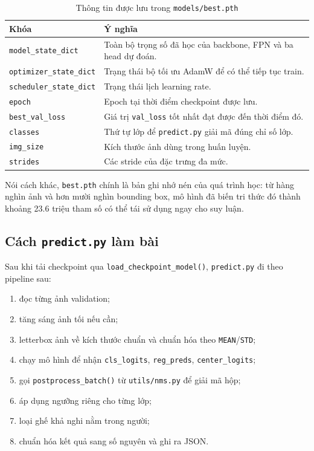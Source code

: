 \documentclass[12pt,a4paper]{article}
\begin{document}
\begin{table}[H]
\centering
\caption{Thông tin được lưu trong \texttt{models/best.pth}}
\label{tab:checkpoint}
\begin{tabularx}{\textwidth}{>{\raggedright\arraybackslash}p{3.3cm}Y}
\toprule
Khóa & Ý nghĩa \\
\midrule
\texttt{model\_state\_dict} & Toàn bộ trọng số đã học của backbone, FPN và ba head dự đoán. \\
\texttt{optimizer\_state\_dict} & Trạng thái bộ tối ưu AdamW để có thể tiếp tục train. \\
\texttt{scheduler\_state\_dict} & Trạng thái lịch learning rate. \\
\texttt{epoch} & Epoch tại thời điểm checkpoint được lưu. \\
\texttt{best\_val\_loss} & Giá trị \texttt{val\_loss} tốt nhất đạt được đến thời điểm đó. \\
\texttt{classes} & Thứ tự lớp để \texttt{predict.py} giải mã đúng chỉ số lớp. \\
\texttt{img\_size} & Kích thước ảnh dùng trong huấn luyện. \\
\texttt{strides} & Các stride của đặc trưng đa mức. \\
\bottomrule
\end{tabularx}
\end{table}

Nói cách khác, \texttt{best.pth} chính là bản ghi nhớ nén của quá trình học: từ hàng nghìn ảnh và hơn mười nghìn bounding box, mô hình đã biến tri thức đó thành khoảng 23.6 triệu tham số có thể tái sử dụng ngay cho suy luận.

\subsection{Cách \texttt{predict.py} làm bài}
Sau khi tải checkpoint qua \texttt{load\_checkpoint\_model()}, \texttt{predict.py} đi theo pipeline sau:
\begin{enumerate}
    \item đọc từng ảnh validation;
    \item tăng sáng ảnh tối nếu cần;
    \item letterbox ảnh về kích thước chuẩn và chuẩn hóa theo \texttt{MEAN}/\texttt{STD};
    \item chạy mô hình để nhận \texttt{cls\_logits}, \texttt{reg\_preds}, \texttt{center\_logits};
    \item gọi \texttt{postprocess\_batch()} từ \texttt{utils/nms.py} để giải mã hộp;
    \item áp dụng ngưỡng riêng cho từng lớp;
    \item loại ghế khả nghi nằm trong người;
    \item chuẩn hóa kết quả sang số nguyên và ghi ra JSON.
\end{enumerate}
\end{document}
